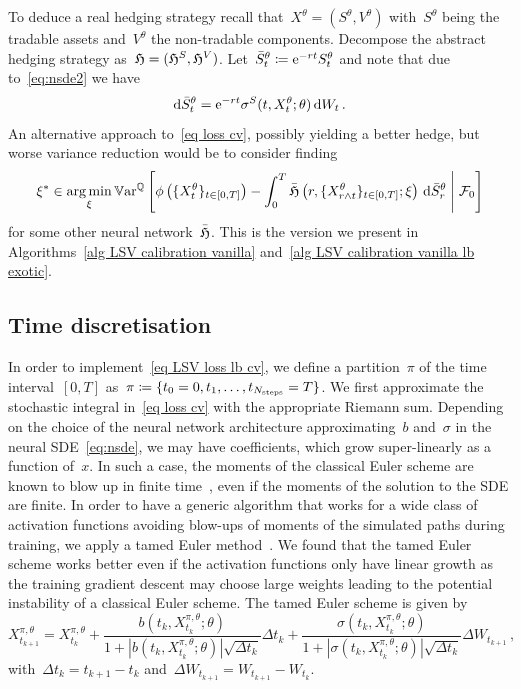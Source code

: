 To deduce a real hedging strategy recall that~$X^{\theta} = (S^\theta, V^\theta)$ with~$S^\theta$ being the tradable assets and~$V^\theta$ the non-tradable components.
Decompose the abstract hedging strategy as~$\mathfrak{H} = (\mathfrak{H}^S, \mathfrak{H}^V)$.
Let~$\bar S^{\theta}_t\coloneqq \mathrm{e}^{-rt}S^{\theta}_t$ and note that due to~\eqref{eq:nsde2} we have 
\[
\mathrm{d}\bar S^{\theta}_t = \mathrm{e}^{-rt}\sigma^S(t,X_t^{\theta};\theta)\,\mathrm{d} W_t\,.
\]
An alternative approach to~\eqref{eq loss cv}, possibly yielding a better hedge, but worse variance reduction would be to consider finding
\begin{equation}\label{eq loss cv real}
\xi^{\ast} \in  \operatorname*{arg\,min}_{\xi} \mathbb{V}\mathrm{ar}^{\mathbb{Q}}\left[\phi\left(\{X_t^\theta\}_{t\in[0,T]}\right) -  \int_0^T \bar {\mathfrak{H}}\left(r,\{X_{r\wedge t}^\theta\}_{t\in[0,T]}; \xi\right) \, \mathrm{d} \bar S^{\theta}_r \;\middle\vert \; \mathcal{F}_0\right]
\end{equation}
for some other neural network~$\bar{\mathfrak{H}}$. 
This is the version we present in Algorithms~\ref{alg LSV calibration vanilla} and~\ref{alg LSV calibration vanilla lb exotic}.
\enlargethispage{\baselineskip}

\subsection{Time discretisation}  
\sloppy In order to implement~\eqref{eq LSV loss lb cv}, we define a partition~$\pi$ of the time interval~$[0,T]$ as~${\pi \coloneqq \{t_0=0, t_1, \ldots, t_{N_{\text{steps}}}=T\}}$. We first approximate the stochastic integral in~\eqref{eq loss cv} with the appropriate Riemann sum. Depending on the choice of the neural network architecture approximating~$b$ and~$\sigma$ in the neural SDE~\eqref{eq:nsde}, we may have coefficients, which grow super-linearly as a function of~$x$. In such a case, the moments of the classical Euler scheme are known to blow up in finite time~\cite{Hutzenthaler2011StrongCoefficients}, even if the moments of the solution to the SDE are finite.
In order to have a generic algorithm that works for a wide class of activation functions avoiding blow-ups of moments of the simulated paths during training, we apply a tamed Euler method~\cite{Hutzenthaler2011StrongCoefficients, Szpruch2018V-integrabilitySDEs}. 
We found that the tamed Euler scheme works better even if the activation functions only have linear growth as the training gradient descent may choose large weights leading to the potential instability of a classical Euler scheme.
The tamed Euler scheme is given by
\begin{equation}
\label{eq tamed scheme}
X_{t_{k+1}}^{\pi, \theta} = X_{t_{k}}^{\pi, \theta} + \frac{b(t_k, X_{t_{k}}^{\pi, \theta};\theta)}{1+|b(t_k,X_{t_{k}}^{\pi, \theta};\theta) |\sqrt{\Delta t_k}} \Delta t_k +\frac{\sigma(t_k,X_{t_{k}}^{\pi, \theta}; \theta)}{1+|  \sigma(t_k,X_{t_{k}}^{\pi, \theta};\theta) |\sqrt{\Delta t_k}}\Delta W_{t_{k+1}}\,,
\end{equation}
with~$\Delta t_k = t_{k+1}-t_k$ and~$\Delta W_{t_{k+1}} = W_{t_{k+1}}- W_{t_{k}}$.


